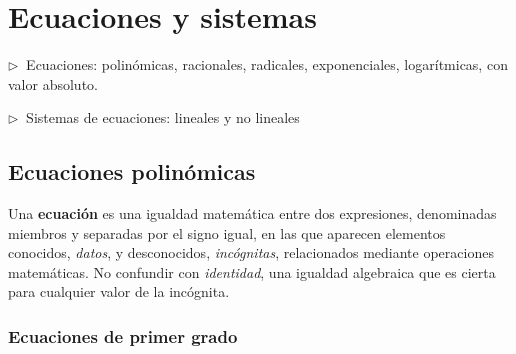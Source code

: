 \chapter{Ecuaciones y sistemas}


\vspace{10mm}
\begin{adjustwidth}{40pt}{40pt}
\begin{cuadro-gris}

	\begin{multicols}{2}
	$\triangleright \ $  Ecuaciones: 
	polinómicas, racionales, radicales, exponenciales, logarítmicas, con valor absoluto.
	
	$\triangleright \ $  Sistemas de ecuaciones: 
	lineales y no lineales
	\end{multicols}
\end{cuadro-gris}
\end{adjustwidth}


\vspace{1cm}
\section{Ecuaciones polinómicas}
\vspace{0.5cm}


Una \textbf{ecuación} es una igualdad matemática entre dos expresiones, denominadas miembros y separadas por el signo igual, en las que aparecen elementos conocidos, \emph{datos}, y  desconocidos, \emph{incógnitas}, relacionados mediante operaciones matemáticas. No confundir con \emph{identidad}, una igualdad algebraica que es cierta para cualquier valor de la incógnita.

\subsection{Ecuaciones de primer grado}
\vspace{0.5cm}

